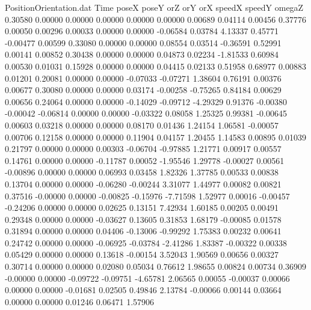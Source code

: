 \begin{filecontents}{PositionOrientation.dat}
Time poseX poseY orZ orY orX speedX speedY omegaZ
   0.30580    0.00000    0.00000     0.00000    0.00000    0.00000    0.00689    0.04114    0.00456
   0.37776    0.00050    0.00296     0.00033    0.00000    0.00000   -0.06584    0.03784    4.13337
   0.45771   -0.00477    0.00599     0.33080    0.00000    0.00000    0.08554    0.03514   -0.36591
   0.52991    0.00141    0.00852     0.30438    0.00000    0.00000    0.04873    0.02234   -1.81533
   0.60984    0.00530    0.01031     0.15928    0.00000    0.00000    0.04415    0.02133    0.51958
   0.68977    0.00883    0.01201     0.20081    0.00000    0.00000   -0.07033   -0.07271    1.38604
   0.76191    0.00376    0.00677     0.30080    0.00000    0.00000    0.03174   -0.00258   -0.75265
   0.84184    0.00629    0.00656     0.24064    0.00000    0.00000   -0.14029   -0.09712   -4.29329
   0.91376   -0.00380   -0.00042    -0.06814    0.00000    0.00000   -0.03322    0.08058    1.25325
   0.99381   -0.00645    0.00603     0.03218    0.00000    0.00000    0.08170    0.01436    1.24154
   1.06581   -0.00057    0.00706     0.12158    0.00000    0.00000    0.11904    0.04157    1.20455
   1.14583    0.00895    0.01039     0.21797    0.00000    0.00000    0.00303   -0.06704   -0.97885
   1.21771    0.00917    0.00557     0.14761    0.00000    0.00000   -0.11787    0.00052   -1.95546
   1.29778   -0.00027    0.00561    -0.00896    0.00000    0.00000    0.06993    0.03458    1.82326
   1.37785    0.00533    0.00838     0.13704    0.00000    0.00000   -0.06280   -0.00244    3.31077
   1.44977    0.00082    0.00821     0.37516   -0.00000    0.00000   -0.00825   -0.15976   -7.71598
   1.52977    0.00016   -0.00457    -0.24206    0.00000    0.00000    0.02625    0.13151    7.42934
   1.60185    0.00205    0.00491     0.29348    0.00000    0.00000   -0.03627    0.13605    0.31853
   1.68179   -0.00085    0.01578     0.31894    0.00000    0.00000    0.04406   -0.13006   -0.99292
   1.75383    0.00232    0.00641     0.24742    0.00000    0.00000   -0.06925   -0.03784   -2.41286
   1.83387   -0.00322    0.00338     0.05429    0.00000    0.00000    0.13618   -0.00154    3.52043
   1.90569    0.00656    0.00327     0.30714    0.00000    0.00000    0.02080    0.05034    0.76612
   1.98655    0.00824    0.00734     0.36909   -0.00000    0.00000   -0.09722   -0.09751   -4.65781
   2.06565    0.00055   -0.00037     0.00066    0.00000    0.00000   -0.01681    0.02505    0.49846
   2.13784   -0.00066    0.00144     0.03664    0.00000    0.00000    0.01246    0.06471    1.57906

\end{filecontents}
